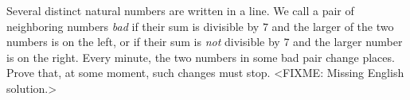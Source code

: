 \problem{}
Several distinct natural numbers are written in a line.
We call a pair of neighboring numbers \emph{bad} if their sum is divisible by $7$ and
the larger of the two numbers is on the left, or if their sum is \emph{not} divisible
by $7$ and the larger number is on the right.
Every minute, the two numbers in some bad pair change places.
Prove that, at some moment, such changes must stop.
\solution
<FIXME: Missing English solution.>
\endproblem
